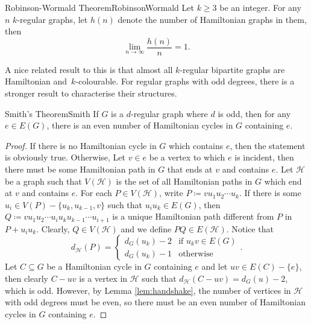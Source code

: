 \documentclass[math]{amznotes}
\theoremstyle{remark}
\begin{document}
\begin{thmbox}{Robinson-Wormald Theorem}{RobinsonWormald}
    Let $k \geq 3$ be an integer. For any $n$ $k$-regular graphs, let $h(n)$ denote the number of Hamiltonian graphs in them, then 
    \begin{equation*}
        \lim_{n \to \infty}\frac{h(n)}{n} = 1.
    \end{equation*}
\end{thmbox}
A nice related result to this is that almost all $k$-regular bipartite graphs are Hamiltonian and~$k$-colourable. For regular graphs with odd degrees, there is a stronger result to characterise their structures.
\begin{thmbox}{Smith's Theorem}{Smith}
    If $G$ is a $d$-regular graph where $d$ is odd, then for any $e \in E(G)$, there is an even number of Hamiltonian cycles in $G$ containing $e$.
    \tcblower
    \begin{proof}
        If there is no Hamiltonian cycle in $G$ which contains $e$, then the statement is obviously true. Otherwise, Let $v \in e$ be a vertex to which $e$ is incident, then there must be some Hamiltonian path in $G$ that ends at $v$ and contains $e$. Let $\mathcal{H}$ be a graph such that $V(\mathcal{H})$ is the set of all Hamiltonian paths in $G$ which end at $v$ and contains $e$. For each $P \in V(\mathcal{H})$, write $P \coloneqq vu_1u_2\cdots u_k$. If there is some $u_i \in V(P) - \{u_k, u_{k - 1}, v\}$ such that $u_iu_k \in E(G)$, then $Q \coloneqq vu_1u_2\cdots u_iu_ku_{k - 1}\cdots u_{i + 1}$ is a unique Hamiltonian path different from $P$ in $P + u_iu_k$. Clearly, $Q \in V(\mathcal{H})$ and we define $PQ \in E(\mathcal{H})$. Notice that 
        \begin{equation*}
            d_{\mathcal{H}}(P) = \begin{cases}
                d_G(u_k) - 2 & \textrm{if } u_kv \in E(G) \\
                d_G(u_k) - 1 & \textrm{otherwise}
            \end{cases}.
        \end{equation*}
        Let $C \subseteq G$ be a Hamiltonian cycle in $G$ containing $e$ and let $uv \in E(C) - \{e\}$, then clearly $C - uv$ is a vertex in $\mathcal{H}$ such that $d_{\mathcal{H}}(C - uv) = d_G(u) - 2$, which is odd. However, by Lemma \ref{lem:handshake}, the number of vertices in $\mathcal{H}$ with odd degrees must be even, so there must be an even number of Hamiltonian cycles in $G$ containing $e$.
    \end{proof}
\end{thmbox}
\end{document}
